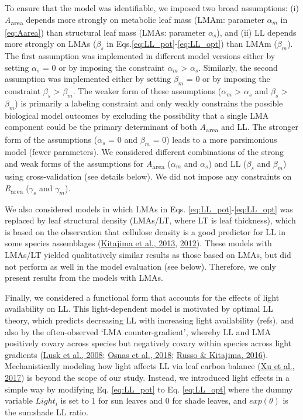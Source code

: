 \documentclass[
  12pt,
  a4paper,
,tablecaptionabove
]{scrartcl}
\begin{document}
To ensure that the model was identifiable, we imposed two broad
assumptions: (i) \emph{A}\textsubscript{area} depends more strongly on
metabolic leaf mass (LMAm: parameter \(\alpha_m\) in \ref{eq:Aarea})
than structural leaf mass (LMAs: parameter \(\alpha_s\)), and (ii) LL
depends more strongly on LMAs (\(\beta_s\) in
Eqs.\ref{eq:LL_pot}-\ref{eq:LL_opt}) than LMAm (\(\beta_m\)). The first
assumption was implemented in different model versions either by setting
\(\alpha_s\) = 0 or by imposing the constraint \(\alpha_m\)
\textgreater{} \(\alpha_s\). Similarly, the second assumption was
implemented either by setting \(\beta_m\) = 0 or by imposing the
constraint \(\beta_s\) \textgreater{} \(\beta_m\). The weaker form of
these assumptions (\(\alpha_m\) \textgreater{} \(\alpha_s\) and
\(\beta_s\) \textgreater{} \(\beta_m\)) is primarily a labeling
constraint and only weakly constrains the possible biological model
outcomes by excluding the possibility that a single LMA component could
be the primary determinant of both \emph{A}\textsubscript{area} and LL.
The stronger form of the assumptions (\(\alpha_s\) = 0 and \(\beta_m\) =
0) leads to a more parsimonious model (fewer parameters). We considered
different combinations of the strong and weak forms of the assumptions
for \emph{A}\textsubscript{area} (\(\alpha_m\) and \(\alpha_s\)) and LL
(\(\beta_s\) and \(\beta_m\)) using cross-validation (see details
below). We did not impose any constraints on
\emph{R}\textsubscript{area} (\(\gamma_s\) and \(\gamma_m\)).

We also considered models in which LMAs in Eqs.
\ref{eq:LL_pot}-\ref{eq:LL_opt} was replaced by leaf structural density
(LMAs/LT, where LT is leaf thickness), which is based on the observation
that cellulose density is a good predictor for LL in some species
assemblages (\protect\hyperlink{ref-Kitajima2013}{Kitajima et al.,
2013}, \protect\hyperlink{ref-Kitajima2012}{2012}). These models with
LMAs/LT yielded qualitatively similar results as those based on LMAs,
but did not perform as well in the model evaluation (see below).
Therefore, we only present results from the models with LMAs.

Finally, we considered a functional form that accounts for the effects
of light availability on LL. This light-dependent model is motivated by
optimal LL theory, which predicts decreasing LL with increasing light
availability (refs), and also by the often-observed `LMA
counter-gradient', whereby LL and LMA positively covary across species
but negatively covary within species across light gradients
(\protect\hyperlink{ref-Lusk2008}{Lusk et al., 2008};
\protect\hyperlink{ref-Osnas2018}{Osnas et al., 2018};
\protect\hyperlink{ref-Russo2016}{Russo \& Kitajima, 2016}).
Mechanistically modeling how light affects LL via leaf carbon balance
(\protect\hyperlink{ref-Xu2017}{Xu et al., 2017}) is beyond the scope of
our study. Instead, we introduced light effects in a simple way by
modifying Eq. \ref{eq:LL_pot} to Eq. \ref{eq:LL_opt} where the dummy
variable \(Light_i\) is set to 1 for sun leaves and 0 for shade leaves,
and \(exp(\theta)\) is the sun:shade LL ratio.
\end{document}
